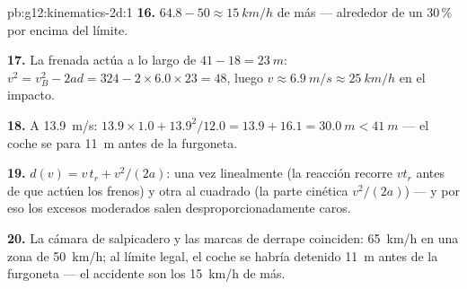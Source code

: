 \begin{solution}{pb:g12:kinematics-2d:1}
\textbf{16.} $64.8 - 50 \approx \qty{15}{km/h}$ de más --- alrededor de
un $30\,\%$ por encima del límite.

\textbf{17.} La frenada actúa a lo largo de $41 - 18 = \qty{23}{m}$:
$v^2 = v_B^2 - 2ad = 324 - 2 \times 6.0 \times 23 = 48$, luego
$v \approx \qty{6.9}{m/s} \approx \qty{25}{km/h}$ en el impacto.

\textbf{18.} A \qty{13.9}{m/s}:
$13.9 \times 1.0 + 13.9^2/12.0 = 13.9 + 16.1 = \qty{30.0}{m} <
\qty{41}{m}$ --- el coche se para \qty{11}{m} antes de la furgoneta.

\textbf{19.} $d(v) = v\,t_r + v^2/(2a)$: una vez linealmente (la
reacción recorre $v t_r$ antes de que actúen los frenos) y otra al
cuadrado (la parte cinética $v^2/(2a)$) --- y por eso los excesos
moderados salen desproporcionadamente caros.

\textbf{20.} La cámara de salpicadero y las marcas de derrape coinciden:
\qty{65}{km/h} en una zona de \qty{50}{km/h}; al límite legal, el coche
se habría detenido \qty{11}{m} antes de la furgoneta --- el accidente
son los \qty{15}{km/h} de más.
\end{solution}
